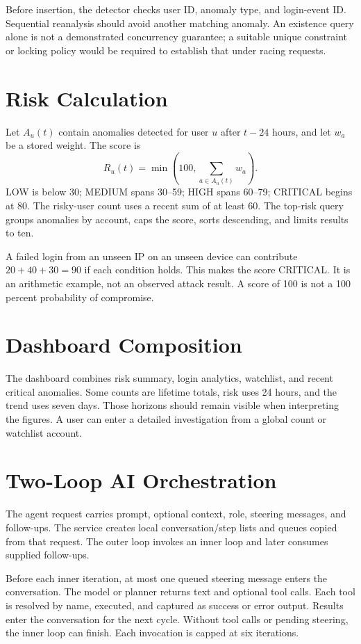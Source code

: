 Before insertion, the detector checks user ID, anomaly type, and login-event ID. Sequential reanalysis should avoid another matching anomaly. An existence query alone is not a demonstrated concurrency guarantee; a suitable unique constraint or locking policy would be required to establish that under racing requests.

\section{Risk Calculation}
Let $A_u(t)$ contain anomalies detected for user $u$ after $t-24$ hours, and let $w_a$ be a stored weight. The score is
\begin{equation}R_u(t)=\min\left(100,\sum_{a\in A_u(t)}w_a\right).\end{equation}
LOW is below 30; MEDIUM spans 30--59; HIGH spans 60--79; CRITICAL begins at 80. The risky-user count uses a recent sum of at least 60. The top-risk query groups anomalies by account, caps the score, sorts descending, and limits results to ten.

A failed login from an unseen IP on an unseen device can contribute $20+40+30=90$ if each condition holds. This makes the score CRITICAL. It is an arithmetic example, not an observed attack result. A score of 100 is not a 100 percent probability of compromise.

\section{Dashboard Composition}
The dashboard combines risk summary, login analytics, watchlist, and recent critical anomalies. Some counts are lifetime totals, risk uses 24 hours, and the trend uses seven days. Those horizons should remain visible when interpreting the figures. A user can enter a detailed investigation from a global count or watchlist account.

\section{Two-Loop AI Orchestration}
The agent request carries prompt, optional context, role, steering messages, and follow-ups. The service creates local conversation/step lists and queues copied from that request. The outer loop invokes an inner loop and later consumes supplied follow-ups.


Before each inner iteration, at most one queued steering message enters the conversation. The model or planner returns text and optional tool calls. Each tool is resolved by name, executed, and captured as success or error output. Results enter the conversation for the next cycle. Without tool calls or pending steering, the inner loop can finish. Each invocation is capped at six iterations.

